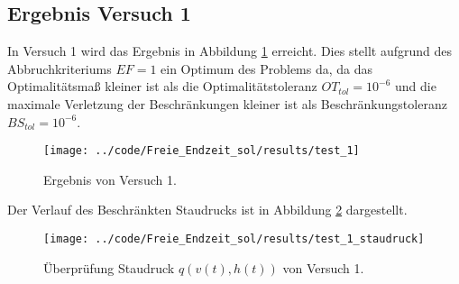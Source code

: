 \subsection{Ergebnis Versuch 1}\label{kap:Versuch1_OptTf}
In Versuch 1 wird das Ergebnis in Abbildung \ref{img:test_1_OptTf} erreicht. Dies stellt aufgrund des Abbruchkriteriums $EF = 1$ ein Optimum des Problems da, da das Optimalitätsmaß kleiner ist als die Optimalitätstoleranz $OT_{tol} = 10^{-6}$ und die maximale Verletzung der Beschränkungen kleiner ist als Beschränkungstoleranz $BS_{tol} = 10^{-6}$.
\begin{figure}[H]
\begin{center}
\texttt{[image: ../code/Freie\_Endzeit\_sol/results/test\_1]}
\caption{Ergebnis von Versuch 1.}\label{img:test_1_OptTf}
\end{center}
\end{figure}
Der Verlauf des Beschränkten Staudrucks ist in Abbildung \ref{img:test_1_staudruck_OptTf} dargestellt.
\begin{figure}[H]
\begin{center}
\texttt{[image: ../code/Freie\_Endzeit\_sol/results/test\_1\_staudruck]}
\caption{Überprüfung Staudruck $q(v(t),h(t))$ von Versuch 1.}\label{img:test_1_staudruck_OptTf}
\end{center}
\end{figure}